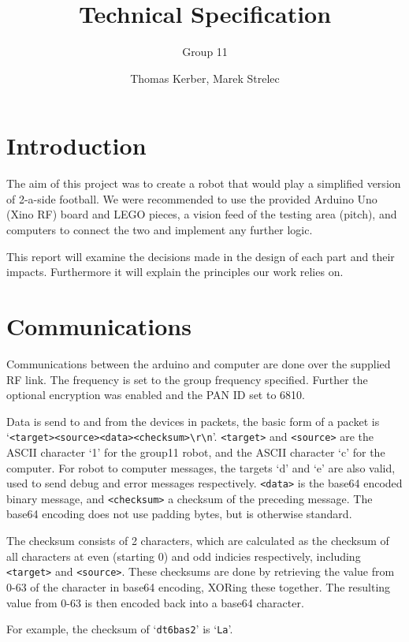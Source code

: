 \documentclass[a4paper]{scrartcl}
\author{Thomas Kerber, Marek Strelec}
\title{Technical Specification}
\subtitle{Group 11}
\begin{document}
\maketitle

\section{Introduction}

The aim of this project was to create a robot that would play a simplified version of 2-a-side football. We were recommended to use the provided Arduino Uno (Xino RF) board and LEGO pieces, a vision feed of the testing area (pitch), and computers to connect the two and implement any further logic.

This report will examine the decisions made in the design of each part and their impacts. Furthermore it will explain the principles our work relies on.

\section{Communications}

Communications between the arduino and computer are done over the supplied RF
link. The frequency is set to the group frequency specified. Further the
optional encryption was enabled and the PAN ID set to 6810.

Data is send to and from the devices in packets, the basic form of a packet is
`\verb$<target><source><data><checksum>\r\n$'. \texttt{<target>} and
\texttt{<source>} are the ASCII character `1' for the group11 robot, and the
ASCII character `c' for the computer. For robot to computer messages, the
targets `d' and `e' are also valid, used to send debug and error messages
respectively. \texttt{<data>} is the base64 encoded binary message, and
\texttt{<checksum>} a checksum of the preceding message.  The base64 encoding
does not use padding bytes, but is otherwise standard.

The checksum consists of 2 characters, which are calculated as the checksum of
all characters at even (starting 0) and odd indicies respectively, including
\texttt{<target>} and \texttt{<source>}. These checksums are done by retrieving
the value from 0-63 of the character in base64 encoding, XORing these together.
The resulting value from 0-63 is then encoded back into a base64 character.

For example, the checksum of `\texttt{dt6bas2}' is `\texttt{La}'.
\end{document}
